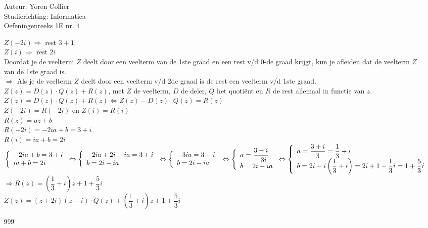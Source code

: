 \documentclass[a4paper]{article}
\newcommand{\asa}{\Leftrightarrow}
\newcommand{\adR}{\Rightarrow}
\newcommand{\Lh}{\left(}
\newcommand{\Rh}{\right)}
\begin{document}
\noindent \large Auteur: Yoren Collier \\
\noindent \large Studierichting: Informatica\\
\noindent \large Oefeningenreeks 1E nr. 4\\

\medskip

\normalsize

$Z(-2i) \adR$ rest $3 + 1$\\

$Z(i) \adR$ rest $2i$\\

Doordat je de veelterm $Z$ deelt door een veelterm van de 1ste graad en een rest v/d 0-de graad krijgt, kun je afleiden dat de veelterm $Z$ van de 1ste graad is.\\

$\adR$ Als je de veelterm $Z$ deelt door een veelterm v/d 2de graad is de rest een veelterm v/d 1ste graad.\\

$Z(z) = D(z) \cdot Q(z) + R(z)$, met $Z$ de veelterm, $D$ de deler, $Q$ het quotiënt en $R$ de rest allemaal in functie van $z$.\\

$Z(z) = D(z) \cdot Q(z) + R(z) \asa Z(z) - D(z) \cdot Q(z) = R(z)$\\

$Z(-2i) = R(-2i)$ en $Z(i) = R(i)$\\

$R(z) = az + b$\\

$R(-2i) = -2ia + b = 3 + i$\\

$R(i) = ia + b = 2i$\\

$\left \{
\begin{array}{l} %
-2ia + b = 3 + i \\
ia + b = 2i
\end{array}
\right .
\asa \left \{
\begin{array}{l}
-2ia + 2i - ia = 3+i \\
b = 2i - ia
\end{array}
\right .
\asa \left \{
\begin{array}{l}
-3ia = 3-i \\
b = 2i - ia
\end{array}
\right . \\
\asa \left \{
\begin{array}{l}
a = \dfrac{3-i}{-3i} \\
b = 2i - ia
\end{array}
\right .
\asa \left \{
\begin{array}{l}
a = \dfrac{3 + i}{3} = \dfrac{1}{3} + i \\
b = 2i - i \Lh\dfrac{1}{3} + i\Rh = 2i + 1 - \dfrac{1}{3}i = 1 + \dfrac{5}{3}i
\end{array}
\right .$\\

$\adR R(z) = \Lh\dfrac{1}{3} + i\Rh z +1 + \dfrac{5}{3}i$\\

$Z(z) = (z + 2i)(z - i) \cdot Q(z) + \Lh\dfrac{1}{3} + i\Rh z +1 + \dfrac{5}{3}i$


\begin{thebibliography}{999}
\end{thebibliography}
\end{document}
